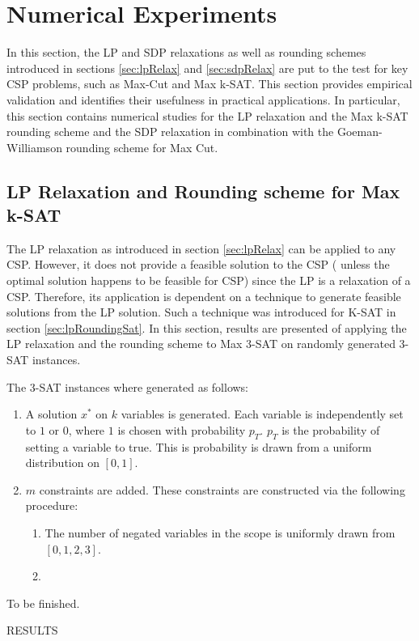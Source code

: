 \section{Numerical Experiments}
In this section, the LP and SDP relaxations as well as rounding schemes introduced in sections \ref{sec:lpRelax} and \ref{sec:sdpRelax} are put to the test for key CSP problems, such as Max-Cut and Max k-SAT. This section provides empirical validation and identifies their usefulness in practical applications. In particular, this section contains numerical studies for the LP relaxation and the Max k-SAT rounding scheme and the SDP relaxation in combination with the Goeman-Williamson rounding scheme for Max Cut. 

\subsection{LP Relaxation and Rounding scheme for Max k-SAT}
The LP relaxation as introduced in section \ref{sec:lpRelax} can be applied to any CSP. However, it does not provide a feasible solution to the CSP ( unless the optimal solution happens to be feasible for CSP) since the LP is a relaxation of a CSP. Therefore, its application is dependent on a technique to generate feasible solutions from the LP solution. Such a technique was introduced for K-SAT in section \ref{sec:lpRoundingSat}. In this section, results are presented of applying the LP relaxation and the rounding scheme to Max 3-SAT on randomly generated 3-SAT instances.

The 3-SAT instances where generated as follows:
\begin{enumerate}
	\item A solution $x^*$ on $k$ variables is generated. Each variable is independently set to $1$ or $0$, where $1$ is chosen with probability $p_T$. $p_T$ is the probability of setting a variable to true. This is probability is drawn from a uniform distribution on $[0,1]$. 
	\item $m$ constraints are added. These constraints are constructed via the following procedure:
	\begin{enumerate}
		\item The number of negated variables in the scope is uniformly drawn from $[0,1,2,3]$.
		\item 
	\end{enumerate}
\end{enumerate}

To be finished.

RESULTS

